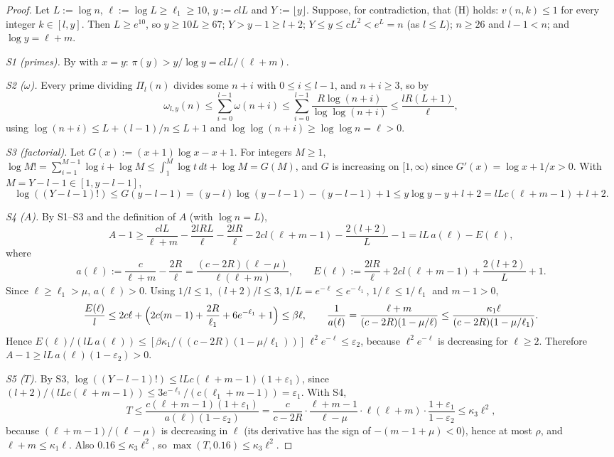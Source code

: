 \documentclass[10pt]{article}
\numberwithin{equation}{section}
\theoremstyle{definition}
\theoremstyle{plain}
\newcommand{\eps}{\varepsilon}
\begin{document}
\begin{proof}
Let $L:=\log n$, $\ell:=\log L\ge\ell_1\ge10$, $y:=clL$ and $Y:=\lfloor y\rfloor$. Suppose, for contradiction,
that (H) holds: $v(n,k)\le1$ for every integer $k\in[l,y]$. Then $L\ge e^{10}$, so $y\ge10L\ge67$;
$Y>y-1\ge l+2$; $Y\le y\le cL^2<e^L=n$ (as $l\le L$); $n\ge26$ and $l-1<n$; and $\log y=\ell+m$.

\emph{S1 (primes).} By \cite[(3.5)]{RS62} with $x=y$: $\pi(y)>y/\log y=clL/(\ell+m)$.

\emph{S2 ($\omega$).} Every prime dividing $\Pi_l(n)$ divides some $n+i$ with $0\le i\le l-1$, and $n+i\ge3$, so
by \cite{Ro83}
\[
\omega_{l,y}(n)\le\sum_{i=0}^{l-1}\omega(n+i)\le\sum_{i=0}^{l-1}\frac{R\log(n+i)}{\log\log(n+i)}\le\frac{lR(L+1)}{\ell},
\]
using $\log(n+i)\le L+(l-1)/n\le L+1$ and $\log\log(n+i)\ge\log\log n=\ell>0$.

\emph{S3 (factorial).} Let $G(x):=(x+1)\log x-x+1$. For integers $M\ge1$,
$\log M!=\sum_{i=1}^{M-1}\log i+\log M\le\int_1^M\log t\,dt+\log M=G(M)$, and $G$ is increasing on $[1,\infty)$
since $G'(x)=\log x+1/x>0$. With $M=Y-l-1\in[1,y-l-1]$,
\[
\log((Y-l-1)!)\le G(y-l-1)=(y-l)\log(y-l-1)-(y-l-1)+1\le y\log y-y+l+2=lLc(\ell+m-1)+l+2.
\]

\emph{S4 ($A$).} By S1--S3 and the definition of $A$ (with $\log n=L$),
\[
A-1\ge\frac{clL}{\ell+m}-\frac{2lRL}{\ell}-\frac{2lR}{\ell}-2cl(\ell+m-1)-\frac{2(l+2)}{L}-1=lL\,a(\ell)-E(\ell),
\]
where
\[
a(\ell):=\frac{c}{\ell+m}-\frac{2R}{\ell}=\frac{(c-2R)(\ell-\mu)}{\ell(\ell+m)},\qquad
E(\ell):=\frac{2lR}{\ell}+2cl(\ell+m-1)+\frac{2(l+2)}{L}+1.
\]
Since $\ell\ge\ell_1>\mu$, $a(\ell)>0$. Using $1/l\le1$, $(l+2)/l\le3$, $1/L=e^{-\ell}\le e^{-\ell_1}$,
$1/\ell\le1/\ell_1$ and $m-1>0$,
\[
\frac{E(\ell)}{l}\le2c\ell+\Bigl(2c(m-1)+\frac{2R}{\ell_1}+6e^{-\ell_1}+1\Bigr)\le\beta\ell,\qquad
\frac1{a(\ell)}=\frac{\ell+m}{(c-2R)(1-\mu/\ell)}\le\frac{\kappa_1\ell}{(c-2R)(1-\mu/\ell_1)}.
\]
Hence $E(\ell)/(lL\,a(\ell))\le[\beta\kappa_1/((c-2R)(1-\mu/\ell_1))]\,\ell^2e^{-\ell}\le\eps_2$, because
$\ell^2e^{-\ell}$ is decreasing for $\ell\ge2$. Therefore $A-1\ge lL\,a(\ell)(1-\eps_2)>0$.

\emph{S5 ($T$).} By S3, $\log((Y-l-1)!)\le lLc(\ell+m-1)(1+\eps_1)$, since
$(l+2)/(lLc(\ell+m-1))\le3e^{-\ell_1}/(c(\ell_1+m-1))=\eps_1$. With S4,
\[
T\le\frac{c(\ell+m-1)(1+\eps_1)}{a(\ell)(1-\eps_2)}
=\frac{c}{c-2R}\cdot\frac{\ell+m-1}{\ell-\mu}\cdot\ell(\ell+m)\cdot\frac{1+\eps_1}{1-\eps_2}\le\kappa_3\ell^2,
\]
because $(\ell+m-1)/(\ell-\mu)$ is decreasing in $\ell$ (its derivative has the sign of $-(m-1+\mu)<0$), hence
at most $\rho$, and $\ell+m\le\kappa_1\ell$. Also $0.16\le\kappa_3\ell^2$, so $\max(T,0.16)\le\kappa_3\ell^2$.


\end{proof}
\end{document}
